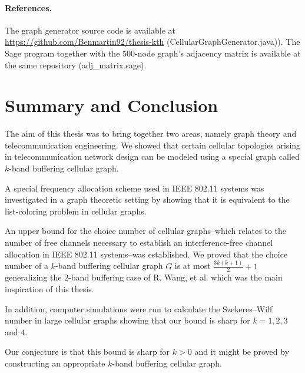 \documentclass[a4paper, 12pt]{article}
\begin{document}
\paragraph*{References.} The graph generator source code is available at \url{https://github.com/Benmartin92/thesis-kth} (CellularGraphGenerator.java)). The Sage program together with the $500$-node graph's adjacency matrix is available at the same repository (adj_matrix.sage).
\section{Summary and Conclusion}
The aim of this thesis was to bring together two areas, namely graph theory and telecommunication engineering. We showed that certain cellular topologies arising in telecommunication network design can be modeled using a special graph called $k$-band buffering cellular graph.

A special frequency allocation scheme used in IEEE 802.11 systems was investigated in a graph theoretic setting by showing that it is equivalent to the list-coloring problem in cellular graphs.

An upper bound for the choice number of cellular graphs\---which relates to the number of free channels necessary to establish an interference-free channel allocation in IEEE 802.11 systems\---was established. We proved that the choice number of a $k$-band buffering cellular graph $G$ is at most $\frac{3k(k+1)}{2}+1$ generalizing the $2$-band buffering case of R. Wang, et al. \cite{7248845} which was the main inspiration of this thesis.

In addition, computer simulations were run to calculate the Szekeres\---Wilf number in large cellular graphs showing that our bound is sharp for $k=1,2,3$ and $4$. 

Our conjecture is that this bound is sharp for $k > 0$ and it might be proved by constructing an appropriate $k$-band buffering cellular graph.
\newpage
\printbibliography
{}
\end{document}
